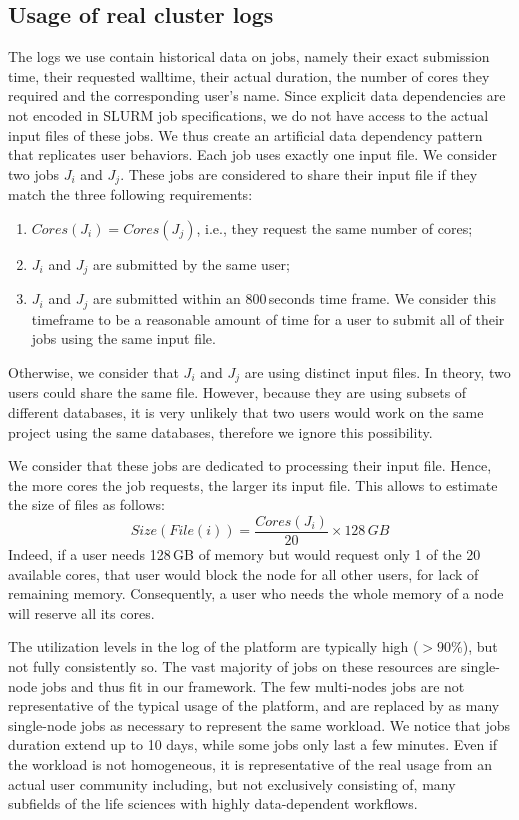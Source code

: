 \documentclass[conference]{IEEEtran}
\newcommand{\file}{\ensuremath{\mathit{File}}\xspace}
\newcommand{\size}{\ensuremath{\mathit{Size}}\xspace}
\newcommand{\core}{\mathit{Cores}\xspace}
\begin{document}
\subsection{Usage of real cluster logs}\label{sec.working}
The logs we use contain historical data on jobs, namely their
exact submission time, their requested walltime, their actual duration, the number of cores they required and the corresponding user's name. 
%
Since explicit data dependencies are not encoded in SLURM job
specifications, we do not have access to the actual input files of
these jobs. We thus create an artificial data dependency pattern that
replicates user behaviors.
Each job uses exactly one input file.
We consider two jobs $J_i$ and $J_j$. These jobs are considered to
share their input file if they match the three following requirements:
\begin{enumerate}
	\item $\core(J_i) = \core(J_j)$, i.e., they request the same number of cores;
	\item $J_i$ and $J_j$ are submitted by the same user;
	\item $J_i$ and $J_j$ are submitted within an 800\,seconds
          time frame. We consider this timeframe to be a reasonable amount of time for a user to submit all of their jobs using the same input file.
\end{enumerate}
Otherwise, we consider that $J_i$ and $J_j$ are using distinct input files. 
In theory, two users could share the same file. 
However, because they are using subsets of different databases, it is very unlikely that two
users would work on the same project using the same databases, therefore we ignore this possibility.

We consider that these jobs are dedicated to processing their input
file. Hence, the more cores the job requests, 
the larger its input file. This allows to estimate the size of files as follows:
$$\size(\file(i)) =\frac{\core(J_i)}{20} \times 128\,GB$$
Indeed, if a user needs 128\,GB of memory but would request only 1 of
the 20 available cores, that user would block the node for all other
users, for lack of remaining memory.
Consequently, a user who needs the whole memory of a node will reserve all its cores. 

The utilization levels in the log of the platform are typically high ($>90\%$), but
not fully consistently so. The vast majority of jobs on these
resources are single-node jobs and thus fit in our framework.
The few multi-nodes jobs are not representative of the typical usage
of the platform, and are replaced by as many single-node jobs as necessary to represent the same workload.
We notice that jobs
duration extend up to 10 days, while some jobs only last a few
minutes. Even if the workload is not homogeneous, it is representative
of the real usage from an actual user community including, but not exclusively consisting of, many subfields of the life sciences with highly data-dependent workflows.
\end{document}
